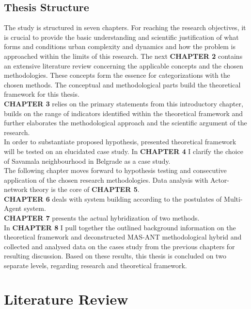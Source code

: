\documentclass[11pt]{report}
\begin{document}
\section{Thesis Structure}

The study is structured in seven chapters.
For reaching the research objectives, it is crucial to provide the basic understanding and scientific justification of what forms and conditions urban complexity and dynamics and how the problem is approached within the limits of this research. The next \textbf{CHAPTER 2} contains an extensive literature review concerning the applicable concepts and the chosen methodologies. These concepts form the essence for categorizations with the chosen methods.
The conceptual and methodological parts build the theoretical framework for this thesis. 
\\
\textbf{CHAPTER 3} relies on the primary statements from this introductory chapter, builds on the range of indicators identified within the theoretical framework and further elaborates the methodological approach and the scientific argument of the research.
\\
In order to substantiate proposed hypothesis,  presented  theoretical framework will be tested on an elucidated case study. In \textbf{CHAPTER 4} I clarify the choice of Savamala neighbourhood in Belgrade as a case study.
\\
The following chapter moves forward to hypothesis testing and consecutive application of the chosen research methodologies. Data analysis with Actor-network theory is the core of \textbf{CHAPTER 5}.
\\
\textbf{CHAPTER 6} deals with system building according to the postulates of Multi-Agent system.
\\
\textbf{CHAPTER 7} presents the actual hybridization of two methods.
\\
In \textbf{CHAPTER 8} I pull together the outlined background  information on the theoretical framework and deconstructed MAS-ANT methodological hybrid and collected and analysed data on the cases study from  the previous  chapters  for  resulting  discussion. Based on these results, this thesis is concluded on two separate levels, regarding research and theoretical framework.



\chapter{Literature Review}
\end{document}
